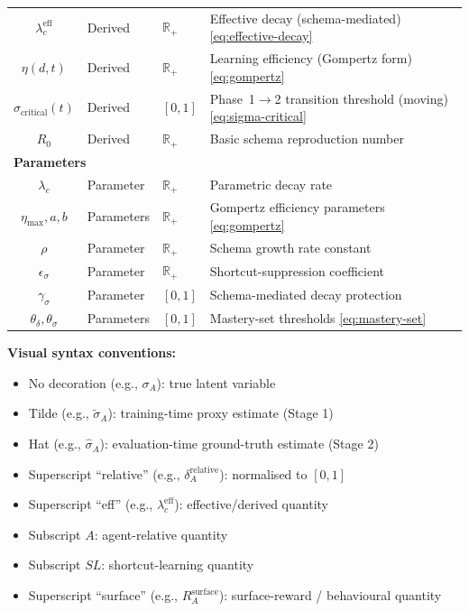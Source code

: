 \documentclass{article}
\theoremstyle{definition}
\newcommand{\R}{\mathbb{R}}
\begin{document}
\begin{center}
\begin{tabular}{c l l >{\raggedright\arraybackslash}p{4.2cm}}
$\lambda_c^{\text{eff}}$ & Derived & $\R_+$ & Effective decay (schema-mediated) \hfill\eqref{eq:effective-decay} \\
$\eta(d,t)$ & Derived & $\R_+$ & Learning efficiency (Gompertz form) \hfill\eqref{eq:gompertz} \\
$\sigma_{\text{critical}}(t)$ & Derived & $[0,1]$ & Phase~1$\to$2 transition threshold (moving) \hfill\eqref{eq:sigma-critical} \\
$R_0$ & Derived & $\R_+$ & Basic schema reproduction number \\
\multicolumn{4}{l}{\textbf{Parameters}} \\
$\lambda_c$ & Parameter & $\R_+$ & Parametric decay rate \\
$\eta_{\max}, a, b$ & Parameters & $\R_+$ & Gompertz efficiency parameters \hfill\eqref{eq:gompertz} \\
$\rho$ & Parameter & $\R_+$ & Schema growth rate constant \\
$\epsilon_\sigma$ & Parameter & $\R_+$ & Shortcut-suppression coefficient \\
$\gamma_\sigma$ & Parameter & $[0,1]$ & Schema-mediated decay protection \\
$\theta_\delta, \theta_\sigma$ & Parameters & $[0,1]$ & Mastery-set thresholds \hfill\eqref{eq:mastery-set} \\
\bottomrule
\end{tabular}
\end{center}

\textbf{Visual syntax conventions:}
\begin{itemize}[nosep]
\item No decoration (e.g., $\sigma_A$): true latent variable
\item Tilde (e.g., $\tilde{\sigma}_A$): training-time proxy estimate (Stage 1)
\item Hat (e.g., $\hat{\sigma}_A$): evaluation-time ground-truth estimate (Stage 2)
\item Superscript ``relative'' (e.g., $\delta_A^{\text{relative}}$): normalised to $[0,1]$
\item Superscript ``eff'' (e.g., $\lambda_c^{\text{eff}}$): effective/derived quantity
\item Subscript $A$: agent-relative quantity
\item Subscript $SL$: shortcut-learning quantity
\item Superscript ``surface'' (e.g., $R_A^{\text{surface}}$): surface-reward / behavioural quantity
\end{itemize}
\end{document}

